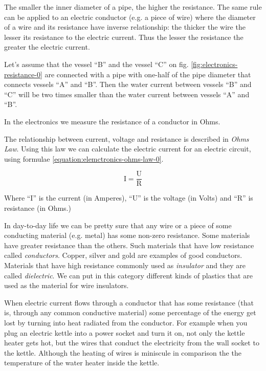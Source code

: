 \documentclass[../sparc.tex]{subfiles}
\begin{document}
The smaller the inner diameter of a pipe, the higher the resistance.  The same
rule can be applied to an electric conductor (e.g. a piece of wire) where the
diameter of a wire and its resistance have inverse relationship: the thicker the
wire the lesser its resistance to the electric current.  Thus the lesser the
resistance the greater the electric current.

Let's assume that the vessel ``B'' and the vessel ``C'' on
fig. \ref{fig:electronics-resistance-0} are connected with a pipe with one-half
of the pipe diameter that connects vessels ``A'' and ``B''.  Then the water
current between vessels ``B'' and ``C'' will be two times smaller than the water
current between vessels ``A'' and ``B''.

In the electronics we measure the resistance of a conductor in Ohms.

The relationship between current, voltage and resistance is described in
\emph{Ohms Law}.  Using this law we can calculate the electric current for an
electric circuit, using formulae \ref{equation:elemctronics-ohms-law-0}.

\begin{equation}
  \mbox{I} = \frac{\mbox{U}}{\mbox{R}}
  \label{equation:elemctronics-ohms-law-0}
\end{equation}

Where ``I'' is the current (in Amperes), ``U'' is the voltage (in Volts) and
``R'' is resistance (in Ohms.)

In day-to-day life we can be pretty sure that any wire or a piece of some
conducting material (e.g. metal) has some non-zero resistance.  Some materials
have greater resistance than the others.  Such materials that have low
resistance called \emph{conductors}.  Copper, silver and gold are examples of
good conductors.  Materials that have high resistance commonly used as
\emph{insulator} and they are called \emph{dielectric}.  We can put in this
category different kinds of plastics that are used as the material for wire
insulators.


When electric current flows through a conductor that has some resistance (that
is, through any common conductive material) some percentage of the energy get
lost by turning into heat radiated from the conductor.  For example when you
plug an electric kettle into a power socket and turn it on, not only the kettle
heater gets hot, but the wires that conduct the electricity from the wall socket
to the kettle.  Although the heating of wires is miniscule in comparison the the
temperature of the water heater inside the kettle.
\end{document}
